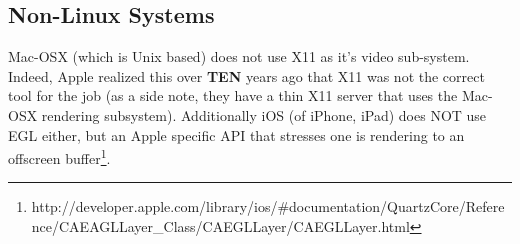 \documentclass[a4paper,11pt]{article}
\begin{document}
\subsection{Non-Linux Systems}
\begin{indenter}{2cm}

Mac-OSX (which is Unix based) does not use X11 as it's video
sub-system. Indeed, Apple realized this over \textbf{TEN} years ago that X11
was not the correct tool for the job (as a side note, they have
a thin X11 server that uses the Mac-OSX rendering subsystem). Additionally
iOS (of iPhone, iPad) does NOT use EGL either, but an Apple specific API
that stresses one is rendering to an offscreen buffer\footnote{http://developer.apple.com/library/ios/\#documentation/QuartzCore/Reference/CAEAGLLayer\_Class/CAEGLLayer/CAEGLLayer.html}.

\end{indenter}
\end{document}
